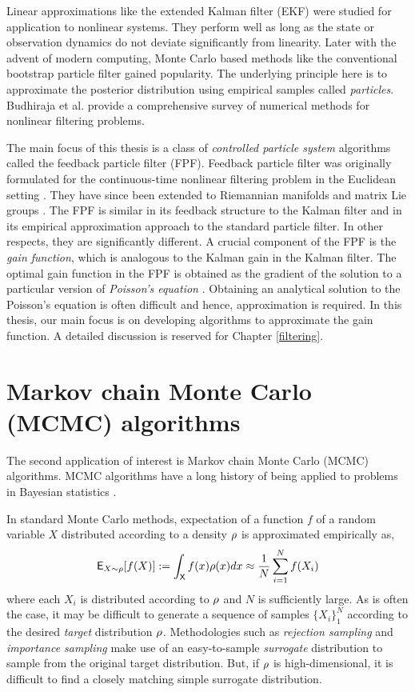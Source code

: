 Linear approximations like the extended Kalman filter (EKF) were studied for application to nonlinear systems. They perform well as long as the state or observation dynamics do not deviate significantly from linearity. Later with the advent of modern computing, Monte Carlo based methods like the conventional bootstrap particle filter gained popularity. The underlying principle here is to approximate the posterior distribution using empirical samples called \textit{particles}. Budhiraja et al. \cite{budchelee07} provide a comprehensive survey of numerical methods for nonlinear filtering problems. 

The main focus of this thesis is a class of \textit{controlled particle system} algorithms called the feedback particle filter (FPF). Feedback particle filter was originally formulated for the continuous-time nonlinear filtering problem in the Euclidean setting \cite{yanmehmey13}. They have since been extended to Riemannian manifolds and matrix Lie groups \cite{zhatagmeh16}. The FPF is similar in its feedback structure to the Kalman filter and in its empirical approximation approach to the standard particle filter. In other respects, they are significantly different. A crucial component of the FPF is the \textit{gain function}, which is analogous to the Kalman gain in the Kalman filter. The optimal gain function in the FPF is obtained as the gradient of the solution to a particular version of \textit{Poisson's equation} \cite{yanmehmey13, laumehmeyrag14}. Obtaining an analytical solution to the Poisson's equation is often difficult and hence, approximation is required. In this thesis, our main focus is on developing algorithms to approximate the gain function. A detailed discussion is reserved for Chapter \ref{filtering}. 

\section{Markov chain Monte Carlo (MCMC) algorithms}
The second application of interest is Markov chain Monte Carlo (MCMC) algorithms. MCMC algorithms have a long history of being applied to problems in Bayesian statistics \cite{}. 

In standard Monte Carlo methods, expectation of a function $f$ of a random variable $X$ distributed according to a density $\rho$ is approximated empirically as,
\[
 {\sf E}_{X \sim \rho} [f(X)] := \int_{\sf X} f(x)\rho(x) dx \approx \frac{1}{N} \sum_{i=1}^N f(X_i) 
\]
where each $X_i$ is distributed according to $\rho$ and $N$ is sufficiently large. As is often the case, it may be difficult to generate a sequence of samples $\{X_i\}_1^N$ according to the desired \textit{target} distribution $\rho$. Methodologies such as \textit{rejection sampling} and \textit{importance sampling} make use of an easy-to-sample \textit{surrogate} distribution to sample from the original target distribution. But, if $\rho$ is high-dimensional, it is difficult to find a closely matching simple surrogate distribution. 

